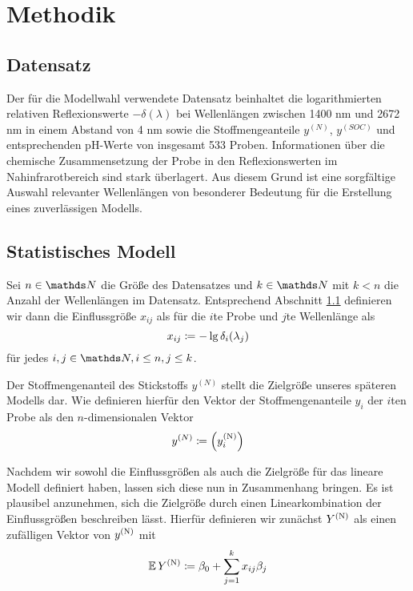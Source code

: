 \section{Methodik}
\label{sec:Methodik}

	\subsection{Datensatz}
	\label{ssec:Datensatz}

	    Der für die Modellwahl verwendete Datensatz beinhaltet die logarithmierten relativen Reflexionswerte $-\delta(\lambda)$ bei Wellenlängen zwischen 1400 nm und 2672 nm in einem Abstand von 4 nm sowie die Stoffmengeanteile $y^{(N)}$, $y^{(SOC)}$ und entsprechenden pH-Werte von insgesamt 533 Proben.
	    Informationen über die chemische Zusammensetzung der Probe in den Reflexionswerten im Nahinfrarotbereich sind stark überlagert. \cite{Agelet2010}
	    Aus diesem Grund ist eine sorgfältige Auswahl relevanter Wellenlängen von besonderer Bedeutung für die Erstellung eines zuverlässigen Modells.



	\subsection{Statistisches Modell}
	\label{ssec:Statistisches Modell}

	    Sei $n\in\SN$ die Größe des Datensatzes und $k\in\SN$ mit $k< n$ die Anzahl der Wellenlängen im Datensatz.
	    Entsprechend Abschnitt \ref{ssec:Datensatz} definieren wir dann die Einflussgröße $x_{ij}$ als für die $i$te Probe und $j$te Wellenlänge als
	    \[
			x_{ij} \coloneqq -\lg \delta_i(\lambda_j)
		\]
		für jedes $i,j\in\SN,i\leq n,j\leq k$.

	    Der Stoffmengenanteil des Stickstoffs  $y^{(N)}$ stellt die Zielgröße unseres späteren Modells dar.
	    Wie definieren hierfür den Vektor der Stoffmengenanteile $y_i$ der $i$ten Probe als den $n$-dimensionalen Vektor
		\[
			 y^{(N)} \coloneqq \left( y^{\mathrm{(N)}}_i \right)
		\]

        Nachdem wir sowohl die Einflussgrößen als auch die Zielgröße für das lineare Modell definiert haben, lassen sich diese nun in Zusammenhang bringen.
        Es ist plausibel anzunehmen, sich die Zielgröße durch einen Linearkombination der Einflussgrößen beschreiben lässt.
        Hierfür definieren wir zunächst $Y^{\mathrm{(N)}}$ als einen zufälligen Vektor von $y^{\mathrm{(N)}}$ mit
        \[
			 \operatorname{\mathbb{E}} Y^{\mathrm{(N)}} \coloneqq \beta_0 + \sum_{j=1}^k{x_{ij}\beta_j}
		\]

